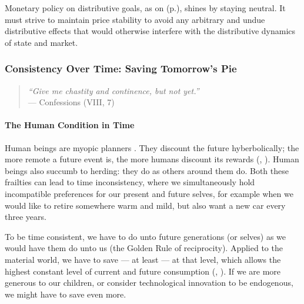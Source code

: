 Monetary policy on distributive goals, as on  (p.\pageref{sec:production}), shines by staying neutral. It must strive to maintain price stability to avoid any arbitrary and undue distributive effects that would otherwise interfere with the distributive dynamics of state and market.

\subsubsection[Consistency Over Time]{Consistency Over Time: Saving Tomorrow's Pie}\label{sec:time} 

\begin{quote}
\emph{``Give me chastity and continence, but not yet.''\\}
--- \citeauthor{St.AugusteofHippo397} Confessions (VIII, 7)
\end{quote}

\paragraph{The Human Condition in Time}
Human beings are myopic planners \citep{Kahneman47}. They discount the future hyberbolically; the more remote a future event is, the more humans discount its rewards (\citealt{Ainslie1975}, \citealt{Thaler1981}). Human beings also succumb to herding: they do as others around them do. %
Both these frailties can lead to time inconsistency, where we simultaneously hold incompatible preferences for our present and future selves, for example when we would like to retire somewhere warm and mild, but also want a new car every three years.

To be time consistent, we have to do unto future generations (or selves) as we would have them do unto us (the Golden Rule of reciprocity). Applied to the material world, we have to save --- at least --- at that level, which allows the highest constant level of current and future consumption (\citealt{Phelps1966a}, \citealt{Solow1956}). If we are more generous to our children, or consider technological innovation to be endogenous, we might have to save even more.

